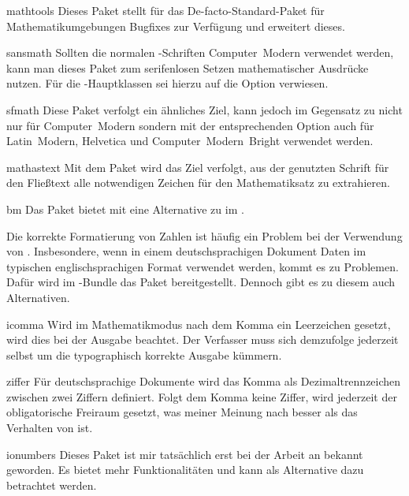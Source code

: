 \begin{packages}
  \item[mathtools]
    Dieses Paket stellt für das De-facto-Standard-Paket  für 
    Mathematikumgebungen Bugfixes zur Verfügung und erweitert dieses.
  \item[sansmath]
    Sollten die normalen -Schriften Computer~Modern verwendet 
    werden, kann man dieses Paket zum serifenlosen Setzen mathematischer 
    Ausdrücke nutzen. Für die \TUDScript-Hauptklassen sei hierzu auf die Option
     verwiesen.
  \item[sfmath]
    Diese Paket verfolgt ein ähnliches Ziel, kann jedoch im Gegensatz zu 
     nicht nur für Computer~Modern sondern mit der 
    entsprechenden Option auch für Latin~Modern, Helvetica und 
    Computer~Modern~Bright verwendet werden.
  \item[mathastext]
     Mit dem Paket wird das Ziel verfolgt, aus der genutzten Schrift für den 
     Fließtext alle notwendigen Zeichen für den Mathematiksatz zu extrahieren.
  \item[bm]
    Das Paket bietet mit  eine Alternative zu  im 
    .
\end{packages}
%
Die korrekte Formatierung von Zahlen ist häufig ein Problem bei der Verwendung 
von . Insbesondere, wenn in einem deutschsprachigen Dokument 
Daten im typischen englischsprachigen Format verwendet werden, kommt es zu 
Problemen. Dafür wird im \TUDScript-Bundle das Paket  
bereitgestellt. Dennoch gibt es zu diesem auch Alternativen.
%
\begin{packages}
  \item[icomma]
    Wird im Mathematikmodus nach dem Komma ein Leerzeichen gesetzt, wird dies 
    bei der Ausgabe beachtet. Der Verfasser muss sich demzufolge jederzeit 
    selbst um die typographisch korrekte Ausgabe kümmern.
  \item[ziffer]
    Für deutschsprachige Dokumente wird das Komma als Dezimaltrennzeichen 
    zwischen zwei Ziffern definiert. Folgt dem Komma keine Ziffer, wird 
    jederzeit der obligatorische Freiraum gesetzt, was meiner Meinung nach 
    besser als das Verhalten von  ist.
  \item[ionumbers]
    Dieses Paket ist mir tatsächlich erst bei der Arbeit an  
    bekannt geworden. Es bietet mehr Funktionalitäten und kann als Alternative 
    dazu betrachtet werden.
\end{packages}
